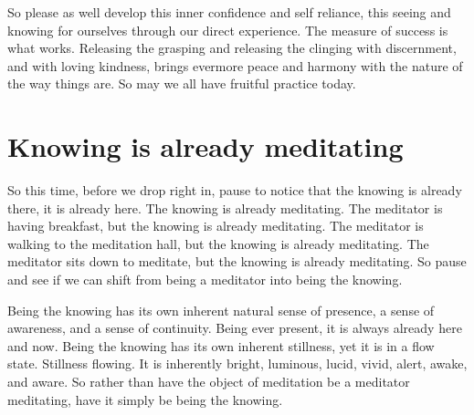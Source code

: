 \documentclass[12pt,openany]{book}
\begin{document}
So please as well develop this inner confidence and self reliance, this seeing and knowing for ourselves through our direct experience. The measure of success is what works. Releasing the grasping and releasing the clinging with discernment, and with loving kindness, brings evermore peace and harmony with the nature of the way things are. So may we all have fruitful practice today.

\bigskip

\begin{figure}[h]
    \centering
\end{figure}

\chapter*{Knowing is already meditating}

So this time, before we drop right in, pause to notice that the knowing is already there, it is already here. The knowing is already meditating. The meditator is having breakfast, but the knowing is already meditating. The meditator is walking to the meditation hall, but the knowing is already meditating. The meditator sits down to meditate, but  the knowing is already meditating. So pause and see if we can shift from being a meditator into being the knowing.

Being the knowing has its own inherent natural sense of presence, a sense of awareness, and a sense of continuity. Being ever pre\-sent, it is always already here and now. Being the knowing has its own inherent stillness, yet it is in a flow state. Stillness flowing. It is inherently bright, luminous, lucid, vivid, alert, awake, and aware. So rather than have the object of meditation be a meditator meditating, have it simply be being the knowing.
\end{document}
